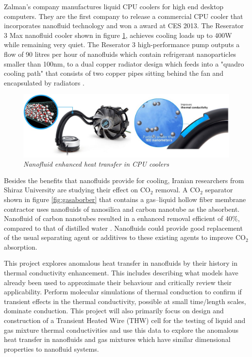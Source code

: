 \documentclass{article}
\begin{document}
Zalman’s company manufactures liquid CPU coolers for high end desktop computers. They are the first company to release a commercial CPU cooler that incorporates nanofluid technology and won a award at CES 2013. The Reserator 3 Max nanofluid cooler shown in figure \ref{fig:CPUcooler}, achieves cooling loads up to 400W while remaining very quiet. The Reserator 3 high-performance pump outputs a flow of 90 litres per hour of nanofluids which contain refrigerant nanoparticles smaller than 100nm, to a dual copper radiator design which feeds into a "quadro cooling path" that consists of two copper pipes sitting behind the fan and encapsulated by radiators \cite{zalman2018}.

	\begin{figure}[h]
		\centering
		\includegraphics[scale=0.5]{img2}
		\caption{\textit{Nanofluid enhanced heat transfer in CPU coolers}}
		\label{fig:CPUcooler} 
	\end{figure}

Besides the benefits that nanofluids provide for cooling, Iranian researchers from Shiraz University are studying their effect on CO$_{2}$ removal. A CO$_{2}$ separator shown in figure \ref{fig:gasaborber} that contains a gas–liquid hollow fiber membrane contractor uses nanofluids of nanosilica and carbon nanotube as the absorbent. Nanofluid of carbon nanotubes resulted in a enhanced removal efficient of 40\%, compared to that of distilled water \cite{golkhar2013investigation}. Nanofluids could provide good replacement of the usual separating agent or additives to these existing agents to improve CO$_{2}$ absorption. 
	
	
This project explores anomalous heat transfer in nanofluids by their history in thermal conductivity enhancement. This includes describing what models have already been used to approximate their behaviour and critically review their applicability. Perform molecular simulations of thermal conduction to confirm if transient effects in the thermal conductivity, possible at small time/length scales, dominate conduction. This project will also primarily focus on design and construction of a Transient Heated Wire (THW) cell for the testing of liquid and gas mixture thermal conductivities and use this data to explore the anomalous heat transfer in nanofluids and gas mixtures which have similar dimensional properties to nanofluid systems.
\end{document}
